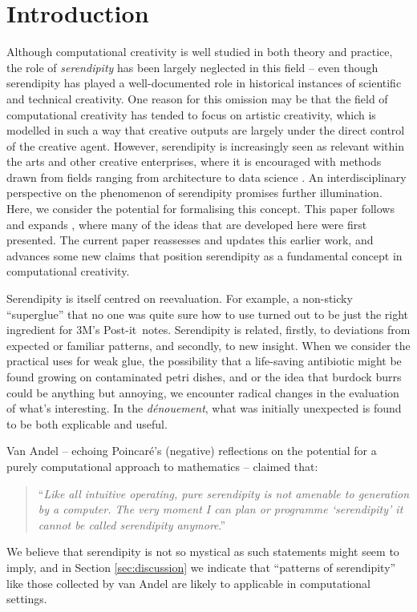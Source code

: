 \section{Introduction}

Although computational creativity is well studied in both theory and
practice, the role of \emph{serendipity} has been largely neglected
in this field -- even though serendipity has played a well-documented
role in historical instances of scientific and technical creativity.
One reason for this omission may be that the field of computational
creativity has tended to focus on artistic creativity, which is modelled in such a way that creative outputs are largely under the direct control of the creative agent.  However,  serendipity is increasingly seen as relevant within the arts
\cite{mckay-serendipity} and other creative enterprises, where it is encouraged with methods drawn from fields ranging from architecture to data science \cite{kakko2009homo,engineering-serendipity}.
%
An interdisciplinary perspective on the phenomenon of serendipity
promises further illumination.  Here, we consider the potential for
formalising this concept.  This paper follows and expands , where many of the ideas that are developed here were first presented.  The current paper reassesses and updates this earlier work, and advances some new claims that position serendipity as a fundamental concept in computational creativity.

Serendipity is itself centred on reevaluation.  For example, a
non-sticky ``superglue'' that no one was quite sure how to use turned
out to be just the right ingredient for 3M's
Post-it\texttrademark\ notes.
%
Serendipity is related, firstly, to deviations from expected or
familiar patterns, and secondly, to new insight.
%
When we consider the practical uses for weak glue, the possibility
that a life-saving antibiotic might be found growing on contaminated
petri dishes, and or the idea that burdock burrs could be anything but
annoying, we encounter radical changes in the evaluation of what's
interesting.  In the \emph{d\'enouement}, what was initially
unexpected is found to be both explicable and useful.

Van Andel \citeyear{van1994anatomy} -- echoing Poincar\'e's
\citeyear{poincare1910creation} (negative) reflections on the potential
for a purely computational approach to mathematics -- claimed that:
\begin{quote}
``\emph{Like all intuitive operating, pure serendipity is not amenable
    to generation by a computer.  The very moment I can plan or
    programme `serendipity' it cannot be called serendipity
    anymore}.'' \cite{van1994anatomy}
\end{quote}
We believe that serendipity is not so mystical as such statements
might seem to imply, and in Section \ref{sec:discussion} we indicate
that ``patterns of serendipity'' like those collected by van Andel
are likely to applicable in computational settings.

